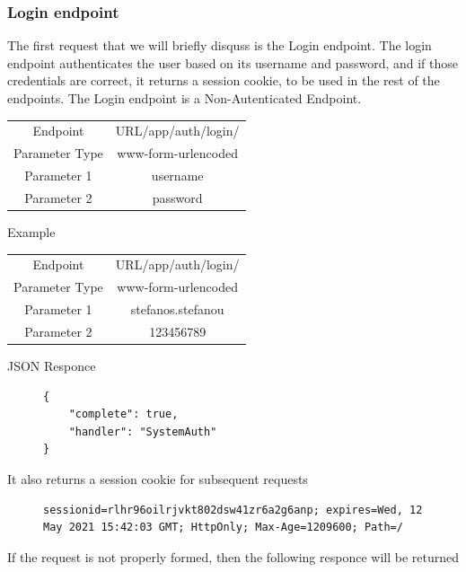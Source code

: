 				\subsubsection{Login endpoint}
					The first request that we will briefly disquss is the Login endpoint. The login endpoint authenticates the user based on its username
					and password, and if those credentials are correct, it returns a session cookie, to be used in the rest of the endpoints. The Login
					endpoint is a Non-Autenticated Endpoint.\par
					\begin{center}
						\begin{tabular}{ |c|c| } 
							\hline
							Endpoint & {{URL}}/app/auth/login/\\
							Parameter Type & www-form-urlencoded  \\
							Parameter 1 & username\\
							Parameter 2 & password  \\
							\hline
						\end{tabular}
					\end{center}
					Example
					\begin{center}
						\begin{tabular}{ |c|c| } 
							\hline
							Endpoint & {{URL}}/app/auth/login/\\
							Parameter Type & www-form-urlencoded  \\
							Parameter 1 & stefanos.stefanou\\
							Parameter 2 & 123456789  \\
							\hline
						\end{tabular}
					\end{center}
					JSON Responce
					\begin{figure}[H]
						\iftrue
						\begin{lstlisting}[]
{
	"complete": true,
	"handler": "SystemAuth"
}
						\end{lstlisting}
					\end{figure}
					It also returns a session cookie for subsequent requests
					\begin{figure}[H]
					\iftrue
						\begin{lstlisting}[]
sessionid=rlhr96oilrjvkt802dsw41zr6a2g6anp; expires=Wed, 12 May 2021 15:42:03 GMT; HttpOnly; Max-Age=1209600; Path=/
						\end{lstlisting}
					\end{figure}
					If the request is not properly formed, then the following responce will be returned
